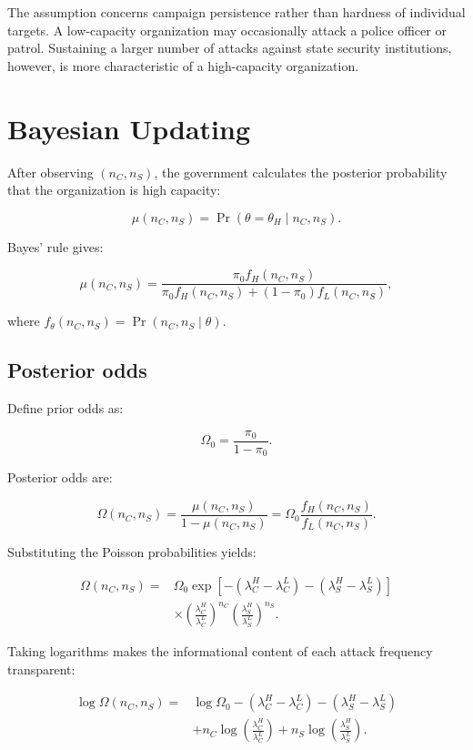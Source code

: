\documentclass[
  letterpaper,
  DIV=11,
  numbers=noendperiod]{scrartcl}
\begin{document}
The assumption concerns campaign persistence rather than hardness of
individual targets. A low-capacity organization may occasionally attack
a police officer or patrol. Sustaining a larger number of attacks
against state security institutions, however, is more characteristic of
a high-capacity organization.

\section{Bayesian Updating}\label{bayesian-updating}

After observing \((n_C,n_S)\), the government calculates the posterior
probability that the organization is high capacity:

\[
\mu(n_C,n_S)
=
\Pr(\theta=\theta_H\mid n_C,n_S).
\]

Bayes' rule gives:

\[
\boxed{
\mu(n_C,n_S)
=
\frac{\pi_0 f_H(n_C,n_S)}
{\pi_0 f_H(n_C,n_S)+(1-\pi_0)f_L(n_C,n_S)},
}
\tag{2}
\]

where \(f_\theta(n_C,n_S)=\Pr(n_C,n_S\mid\theta)\).

\subsection{Posterior odds}\label{posterior-odds}

Define prior odds as:

\[
\Omega_0=\frac{\pi_0}{1-\pi_0}.
\]

Posterior odds are:

\[
\Omega(n_C,n_S)
=
\frac{\mu(n_C,n_S)}{1-\mu(n_C,n_S)}
=
\Omega_0\frac{f_H(n_C,n_S)}{f_L(n_C,n_S)}.
\]

Substituting the Poisson probabilities yields:

\[
\boxed{
\begin{aligned}
\Omega(n_C,n_S)
={}&\Omega_0
\exp\left[-(\lambda_C^H-\lambda_C^L)-(\lambda_S^H-\lambda_S^L)\right]\\
&\times
\left(\frac{\lambda_C^H}{\lambda_C^L}\right)^{n_C}
\left(\frac{\lambda_S^H}{\lambda_S^L}\right)^{n_S}.
\end{aligned}
}
\tag{3}
\]

Taking logarithms makes the informational content of each attack
frequency transparent:

\[
\boxed{
\begin{aligned}
\log\Omega(n_C,n_S)
={}&\log\Omega_0
-(\lambda_C^H-\lambda_C^L)
-(\lambda_S^H-\lambda_S^L)\\
&+n_C\log\left(\frac{\lambda_C^H}{\lambda_C^L}\right)
+n_S\log\left(\frac{\lambda_S^H}{\lambda_S^L}\right).
\end{aligned}
}
\tag{4}
\]
\end{document}
